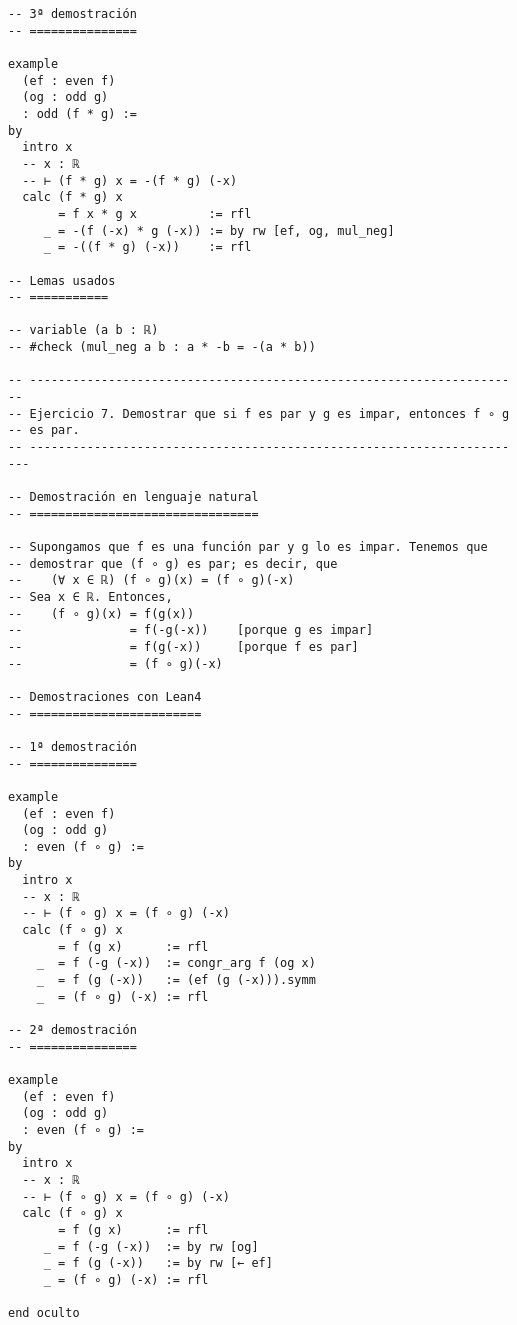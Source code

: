 \begin{verbatim}
-- 3ª demostración
-- ===============

example
  (ef : even f)
  (og : odd g)
  : odd (f * g) :=
by
  intro x
  -- x : ℝ
  -- ⊢ (f * g) x = -(f * g) (-x)
  calc (f * g) x
       = f x * g x          := rfl
     _ = -(f (-x) * g (-x)) := by rw [ef, og, mul_neg]
     _ = -((f * g) (-x))    := rfl

-- Lemas usados
-- ===========

-- variable (a b : ℝ)
-- #check (mul_neg a b : a * -b = -(a * b))

-- ---------------------------------------------------------------------
-- Ejercicio 7. Demostrar que si f es par y g es impar, entonces f ∘ g
-- es par.
-- ----------------------------------------------------------------------

-- Demostración en lenguaje natural
-- ================================

-- Supongamos que f es una función par y g lo es impar. Tenemos que
-- demostrar que (f ∘ g) es par; es decir, que
--    (∀ x ∈ ℝ) (f ∘ g)(x) = (f ∘ g)(-x)
-- Sea x ∈ ℝ. Entonces,
--    (f ∘ g)(x) = f(g(x))
--               = f(-g(-x))    [porque g es impar]
--               = f(g(-x))     [porque f es par]
--               = (f ∘ g)(-x)

-- Demostraciones con Lean4
-- ========================

-- 1ª demostración
-- ===============

example
  (ef : even f)
  (og : odd g)
  : even (f ∘ g) :=
by
  intro x
  -- x : ℝ
  -- ⊢ (f ∘ g) x = (f ∘ g) (-x)
  calc (f ∘ g) x
       = f (g x)      := rfl
    _  = f (-g (-x))  := congr_arg f (og x)
    _  = f (g (-x))   := (ef (g (-x))).symm
    _  = (f ∘ g) (-x) := rfl

-- 2ª demostración
-- ===============

example
  (ef : even f)
  (og : odd g)
  : even (f ∘ g) :=
by
  intro x
  -- x : ℝ
  -- ⊢ (f ∘ g) x = (f ∘ g) (-x)
  calc (f ∘ g) x
       = f (g x)      := rfl
     _ = f (-g (-x))  := by rw [og]
     _ = f (g (-x))   := by rw [← ef]
     _ = (f ∘ g) (-x) := rfl

end oculto
\end{verbatim}

